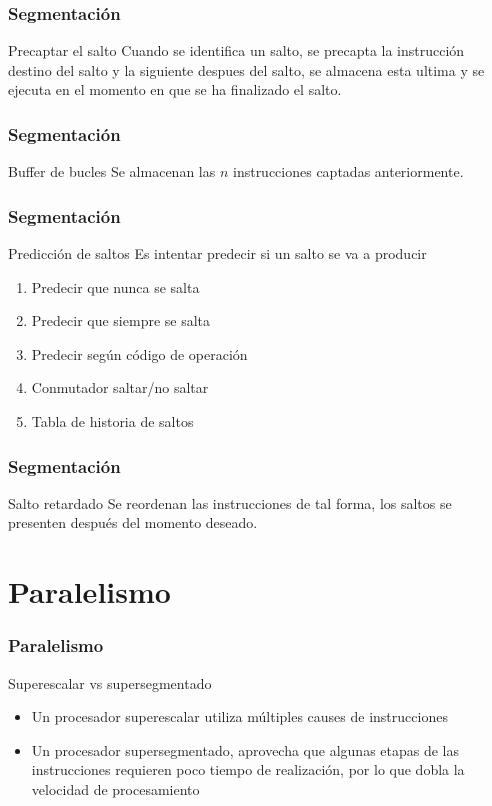 \documentclass{beamer}
\begin{document}
\begin{frame}
	\frametitle{Segmentación}
	\begin{block}{Precaptar el salto}
	Cuando se identifica un salto, se precapta la instrucción destino del salto y la siguiente despues del salto, se almacena esta ultima y se ejecuta en el momento en que se ha finalizado el salto.
	\end{block}		 		
\end{frame}

\begin{frame}
	\frametitle{Segmentación}
	\begin{block}{Buffer de bucles}
	Se almacenan las $n$ instrucciones captadas anteriormente.
	\end{block}		 		
\end{frame}

\begin{frame}
	\frametitle{Segmentación}
	\begin{block}{Predicción de saltos}
	Es intentar predecir si un salto se va a producir
	\begin{enumerate}
		\item Predecir que nunca se salta
		\item Predecir que siempre se salta
		\item Predecir según código de operación
		\item Conmutador saltar/no saltar
		\item Tabla de historia de saltos
	\end{enumerate}
	\end{block}		 		
\end{frame}

\begin{frame}
	\frametitle{Segmentación}
	\begin{block}{Salto retardado}
	Se reordenan las instrucciones de tal forma, los saltos se presenten después del momento deseado.
	\end{block}		 		
\end{frame}

\section{Paralelismo}

\begin{frame}
	\frametitle{Paralelismo}
	\begin{block}{Superescalar vs supersegmentado}
	\begin{itemize}
		\item Un procesador superescalar utiliza múltiples causes de instrucciones
		\item Un procesador supersegmentado, aprovecha que algunas etapas de las instrucciones requieren poco tiempo de realización, por lo que dobla la velocidad de procesamiento
	\end{itemize}
	\end{block}		 		
\end{frame}
\end{document}
